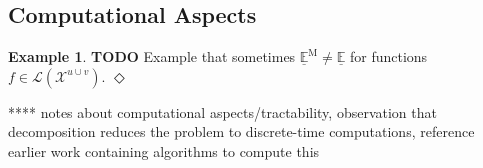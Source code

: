 \documentclass[10pt,a4paper]{paper}
\theoremstyle{definition}
\newtheorem{exmp}{Example}%
\newtheorem{proposition}[theorem]{Proposition}
\newtheorem{corollary}[theorem]{Corollary}
\newcommand{\reals}{\mathbb{R}}
\newcommand{\realspos}{\reals_{>0}}
\newcommand{\realsnonneg}{\reals_{\geq 0}}
\newcommand{\states}{\mathcal{X}}
\newcommand{\processes}{\mathbb{P}}
\newcommand{\wprocesses}{\processes^{\mathrm{W}}}
\newcommand{\gambles}{\mathcal{L}}
\newcommand{\rateset}{\mathcal{Q}}
\newcommand{\lrate}{\underline{Q}}
\newcommand{\norm}[1]{\left\lVert #1 \right\rVert}
\newcommand{\exampleend}{\hfill$\Diamond$}
\begin{document}
%
%

\subsection{Computational Aspects}\label{sec:tractability}

\begin{exmp}
{\bf TODO} Example that sometimes $\underline{\mathbb{E}}^\mathrm{M}\neq \underline{\mathbb{E}}$ for functions $f\in\gambles(\states^{u\cup v})$.
\exampleend
\end{exmp}

**** notes about computational aspects/tractability, observation that decomposition reduces the problem to discrete-time computations, reference earlier work containing algorithms to compute this
\end{document}
